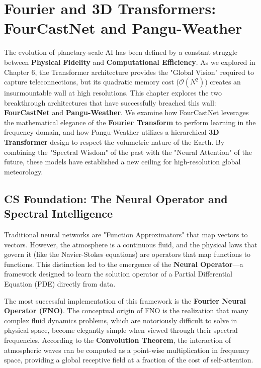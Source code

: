 \chapter{Fourier and 3D Transformers: FourCastNet and Pangu-Weather}

The evolution of planetary-scale AI has been defined by a constant struggle between \textbf{Physical Fidelity} and \textbf{Computational Efficiency}. As we explored in Chapter 6, the Transformer architecture provides the "Global Vision" required to capture teleconnections, but its quadratic memory cost ($\mathcal{O}(N^2)$) creates an insurmountable wall at high resolutions. This chapter explores the two breakthrough architectures that have successfully breached this wall: \textbf{FourCastNet} and \textbf{Pangu-Weather}. We examine how FourCastNet leverages the mathematical elegance of the \textbf{Fourier Transform} to perform learning in the frequency domain, and how Pangu-Weather utilizes a hierarchical \textbf{3D Transformer} design to respect the volumetric nature of the Earth. By combining the "Spectral Wisdom" of the past with the "Neural Attention" of the future, these models have established a new ceiling for high-resolution global meteorology.

\section{CS Foundation: The Neural Operator and Spectral Intelligence}

Traditional neural networks are "Function Approximators" that map vectors to vectors. However, the atmosphere is a continuous fluid, and the physical laws that govern it (like the Navier-Stokes equations) are operators that map functions to functions. This distinction led to the emergence of the \textbf{Neural Operator}—a framework designed to learn the solution operator of a Partial Differential Equation (PDE) directly from data.

The most successful implementation of this framework is the \textbf{Fourier Neural Operator (FNO)}. The conceptual origin of FNO is the realization that many complex fluid dynamics problems, which are notoriously difficult to solve in physical space, become elegantly simple when viewed through their spectral frequencies. According to the \textbf{Convolution Theorem}, the interaction of atmospheric waves can be computed as a point-wise multiplication in frequency space, providing a global receptive field at a fraction of the cost of self-attention.

